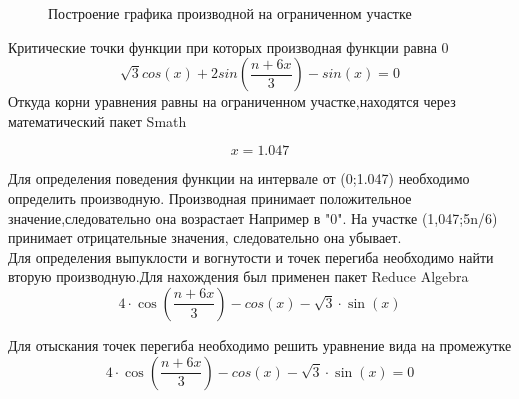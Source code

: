 \documentclass[russian,utf8,nocolumnxxxi,nocolumnxxxii]{eskdtext}
\begin{document}
\begin{figure}[!ht]
    \centering
{}
\caption{Построение графика производной на ограниченном участке}
    \label{fig:my_label}
\end{figure}
Критические точки функции при которых производная функции равна 0
\begin{equation}
\sqrt3cos(x)+2sin\left(\frac{n+6x}{3}\right)-sin(x)=0
\end{equation}
Откуда корни уравнения равны на ограниченном участке,находятся через математический пакет Smath

\begin{equation}
x=1.047
\end{equation}

Для определения поведения функции на интервале от (0;1.047) необходимо определить производную.
Производная принимает положительное значение,следовательно она возрастает
Например в "0".
На участке (1,047;5n/6) принимает отрицательные значения, следовательно она убывает.\\
Для определения выпуклости и вогнутости и точек перегиба необходимо найти вторую производную.Для нахождения был применен пакет Reduce Algebra
\begin{equation}
4\cdot\cos\left(\frac{n+6x}{3}\right)-cos(x)-\sqrt3\cdot\sin(x)
\end{equation}

Для отыскания точек перегиба необходимо решить уравнение вида на промежутке
\begin{equation}
4\cdot\cos\left(\frac{n+6x}{3}\right)-cos(x)-\sqrt3\cdot\sin(x)=0
\end{equation}
\end{document}
